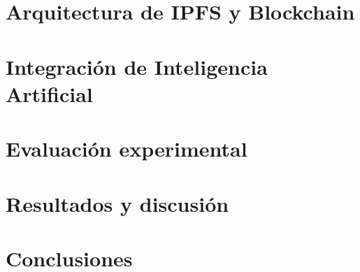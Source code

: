 \documentclass[runningheads]{llncs}
\begin{document}
\section{Arquitectura de IPFS y Blockchain}

\section{Integración de Inteligencia Artificial}

\section{Evaluación experimental}

\section{Resultados y discusión}

\section{Conclusiones}



\end{document}
